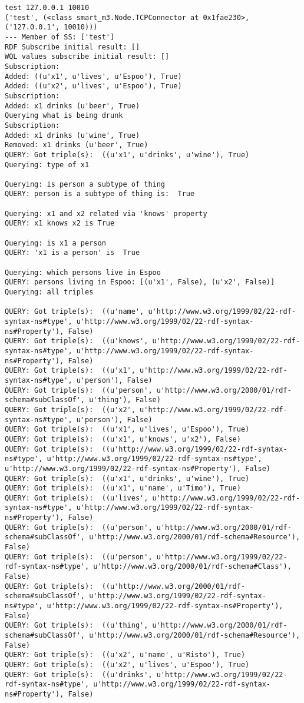 \begin{verbatim}
test 127.0.0.1 10010
('test', (<class smart_m3.Node.TCPConnector at 0x1fae230>, ('127.0.0.1', 10010)))
--- Member of SS: ['test']
RDF Subscribe initial result: []
WQL values subscribe initial result: []
Subscription:
Added: ((u'x1', u'lives', u'Espoo'), True)
Added: ((u'x2', u'lives', u'Espoo'), True)
Subscription:
Added: x1 drinks (u'beer', True)
Querying what is being drunk
Subscription:
Added: x1 drinks (u'wine', True)
Removed: x1 drinks (u'beer', True)
QUERY: Got triple(s):  ((u'x1', u'drinks', u'wine'), True)
Querying: type of x1

Querying: is person a subtype of thing
QUERY: person is a subtype of thing is:  True

Querying: x1 and x2 related via 'knows' property
QUERY: x1 knows x2 is True

Querying: is x1 a person
QUERY: 'x1 is a person' is  True

Querying: which persons live in Espoo
QUERY: persons living in Espoo: [(u'x1', False), (u'x2', False)]
Querying: all triples

QUERY: Got triple(s):  ((u'name', u'http://www.w3.org/1999/02/22-rdf-syntax-ns#type', u'http://www.w3.org/1999/02/22-rdf-syntax-ns#Property'), False)
QUERY: Got triple(s):  ((u'knows', u'http://www.w3.org/1999/02/22-rdf-syntax-ns#type', u'http://www.w3.org/1999/02/22-rdf-syntax-ns#Property'), False)
QUERY: Got triple(s):  ((u'x1', u'http://www.w3.org/1999/02/22-rdf-syntax-ns#type', u'person'), False)
QUERY: Got triple(s):  ((u'person', u'http://www.w3.org/2000/01/rdf-schema#subClassOf', u'thing'), False)
QUERY: Got triple(s):  ((u'x2', u'http://www.w3.org/1999/02/22-rdf-syntax-ns#type', u'person'), False)
QUERY: Got triple(s):  ((u'x1', u'lives', u'Espoo'), True)
QUERY: Got triple(s):  ((u'x1', u'knows', u'x2'), False)
QUERY: Got triple(s):  ((u'http://www.w3.org/1999/02/22-rdf-syntax-ns#type', u'http://www.w3.org/1999/02/22-rdf-syntax-ns#type', u'http://www.w3.org/1999/02/22-rdf-syntax-ns#Property'), False)
QUERY: Got triple(s):  ((u'x1', u'drinks', u'wine'), True)
QUERY: Got triple(s):  ((u'x1', u'name', u'Timo'), True)
QUERY: Got triple(s):  ((u'lives', u'http://www.w3.org/1999/02/22-rdf-syntax-ns#type', u'http://www.w3.org/1999/02/22-rdf-syntax-ns#Property'), False)
QUERY: Got triple(s):  ((u'person', u'http://www.w3.org/2000/01/rdf-schema#subClassOf', u'http://www.w3.org/2000/01/rdf-schema#Resource'), False)
QUERY: Got triple(s):  ((u'person', u'http://www.w3.org/1999/02/22-rdf-syntax-ns#type', u'http://www.w3.org/2000/01/rdf-schema#Class'), False)
QUERY: Got triple(s):  ((u'http://www.w3.org/2000/01/rdf-schema#subClassOf', u'http://www.w3.org/1999/02/22-rdf-syntax-ns#type', u'http://www.w3.org/1999/02/22-rdf-syntax-ns#Property'), False)
QUERY: Got triple(s):  ((u'thing', u'http://www.w3.org/2000/01/rdf-schema#subClassOf', u'http://www.w3.org/2000/01/rdf-schema#Resource'), False)
QUERY: Got triple(s):  ((u'x2', u'name', u'Risto'), True)
QUERY: Got triple(s):  ((u'x2', u'lives', u'Espoo'), True)
QUERY: Got triple(s):  ((u'drinks', u'http://www.w3.org/1999/02/22-rdf-syntax-ns#type', u'http://www.w3.org/1999/02/22-rdf-syntax-ns#Property'), False)


\end{verbatim}
